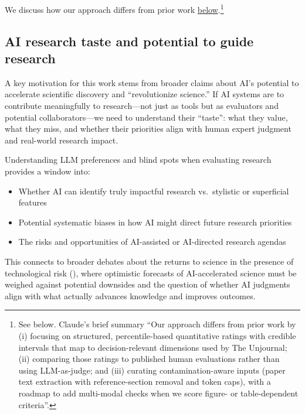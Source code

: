 \documentclass[
  11pt,
  letterpaper,
  DIV=11,
  numbers=noendperiod]{scrreprt}
\providecommand{\tightlist}{%
  \setlength{\itemsep}{0pt}\setlength{\parskip}{0pt}}
\begin{document}
We discuss how our approach differs from prior work
\hyperref[sec-our-present-focus-the-unjournal-opportunity]{below}.\footnote{See
  below. Claude's brief summary ``Our approach differs from prior work
  by (i) focusing on structured, percentile-based quantitative ratings
  with credible intervals that map to decision-relevant dimensions used
  by The Unjournal; (ii) comparing those ratings to published human
  evaluations rather than using LLM-as-judge; and (iii) curating
  contamination-aware inputs (paper text extraction with
  reference-section removal and token caps), with a roadmap to add
  multi-modal checks when we score figure- or table-dependent
  criteria''.}

\subsection{AI research taste and potential to guide
research}\label{sec-ai-research-taste-and-potential-to-guide-research}

A key motivation for this work stems from broader claims about AI's
potential to accelerate scientific discovery and ``revolutionize
science.'' If AI systems are to contribute meaningfully to
research---not just as tools but as evaluators and potential
collaborators---we need to understand their ``taste'': what they value,
what they miss, and whether their priorities align with human expert
judgment and real-world research impact.

Understanding LLM preferences and blind spots when evaluating research
provides a window into:

\begin{itemize}
\tightlist
\item
  Whether AI can identify truly impactful research vs.~stylistic or
  superficial features
\item
  Potential systematic biases in how AI might direct future research
  priorities
\item
  The risks and opportunities of AI-assisted or AI-directed research
  agendas
\end{itemize}

This connects to broader debates about the returns to science in the
presence of technological risk (), where optimistic forecasts of AI-accelerated science must be
weighed against potential downsides and the question of whether AI
judgments align with what actually advances knowledge and improves
outcomes.
\end{document}
